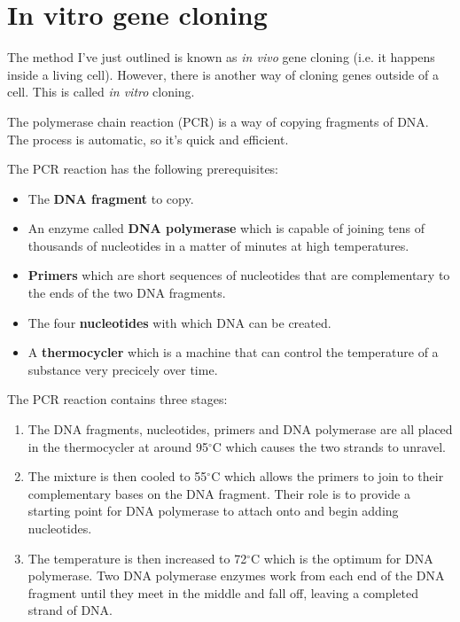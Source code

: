 \documentclass{article}
\begin{document}
\section*{In vitro gene cloning}

The method I've just outlined is known as {\it in vivo} gene cloning (i.e. it
happens inside a living cell). However, there is another way of cloning genes
outside of a cell. This is called {\it in vitro} cloning.

The polymerase chain reaction (PCR) is a way of copying fragments of DNA. The
process is automatic, so it's quick and efficient.

The PCR reaction has the following prerequisites:

\begin{itemize}
	
	\item The {\bf DNA fragment} to copy.

	\item An enzyme called {\bf DNA polymerase} which is capable of joining tens
	of thousands of nucleotides in a matter of minutes at high temperatures.

	\item {\bf Primers} which are short sequences of nucleotides that are
	complementary to the ends of the two DNA fragments.

	\item The four {\bf nucleotides} with which DNA can be created.

	\item A {\bf thermocycler} which is a machine that can control the
	temperature of a substance very precicely over time.

\end{itemize}

The PCR reaction contains three stages:

\begin{enumerate}

	\item The DNA fragments, nucleotides, primers and DNA polymerase are all
	placed in the thermocycler at around 95$^\circ$C which causes the two
	strands to unravel.

	\item The mixture is then cooled to 55$^\circ$C which allows the primers to
	join to their complementary bases on the DNA fragment. Their role is to
	provide a starting point for DNA polymerase to attach onto and begin adding
	nucleotides.

	\item The temperature is then increased to 72$^\circ$C which is the optimum
	for DNA polymerase. Two DNA polymerase enzymes work from each end of the
	DNA fragment until they meet in the middle and fall off, leaving a
	completed strand of DNA.

\end{enumerate}
\end{document}
